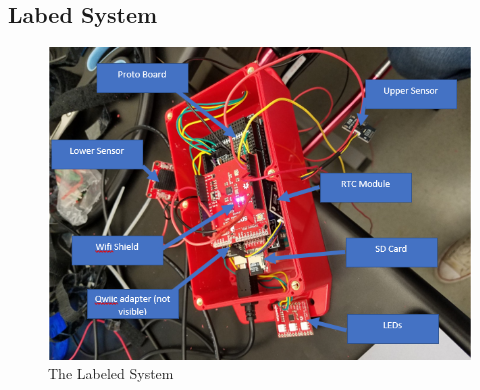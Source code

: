 \documentclass{article}
\begin{document}
\subsection{Labed System}
\begin{figure} [h]
	\begin{center}
		\caption {The Labeled System} \label{fig:labels}
		\includegraphics[width=\textwidth]{./images/LabeledSystem.png}
	\end{center}
\end{figure}
\end{document}
